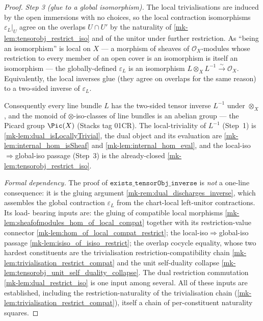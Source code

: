 \begin{proof}
  \emph{Step 3 (glue to a global isomorphism).} The local trivialisations are induced
  by the open immersions with no choices, so the local contraction isomorphisms
  \(\varepsilon_L|_U\) agree on the overlaps \(U \cap U'\) by the naturality of
  \ref{mk-lem:tensorobj_restrict_iso} and of the unitor under further restriction. As
  ``being an isomorphism'' is local on \(X\) --- a morphism of sheaves of
  \(\mathcal{O}_X\)-modules whose restriction to every member of an open cover is an
  isomorphism is itself an isomorphism --- the globally-defined \(\varepsilon_L\) is an
  isomorphism \(L \otimes_X L^{-1} \xrightarrow{\sim} \mathcal{O}_X\). Equivalently, the
  local inverses glue (they agree on overlaps for the same reason) to a two-sided
  inverse of \(\varepsilon_L\).

  Consequently every line bundle \(L\) has the two-sided tensor inverse \(L^{-1}\)
  under \(\otimes_X\), and the monoid of \(\otimes\)-iso-classes of line bundles is
  an abelian group --- the Picard group \(\Pic(X)\) (Stacks tag 01CR). The
  local-triviality of \(L^{-1}\) (Step~1) is \ref{mk-lem:dual_isLocallyTrivial}, the
  dual object and its evaluation are \ref{mk-lem:internal_hom_isSheaf} and
  \ref{mk-lem:internal_hom_eval}, and the local-iso\(\Rightarrow\)global-iso passage
  (Step~3) is the already-closed \ref{mk-lem:tensorobj_restrict_iso}.

  \emph{Formal dependency.} The proof of
  \(\mathtt{exists\_tensorObj\_inverse}\) is \emph{not} a one-line consequence: it is
  the gluing argument \ref{mk-rem:dual_discharges_inverse}, which assembles the global
  contraction \(\varepsilon_L\) from the chart-local left-unitor contractions. Its load-
  bearing inputs are: the gluing of compatible local morphisms
  \ref{mk-lem:sheafofmodules_hom_of_local_compat} together with its restriction-value
  connector \ref{mk-lem:hom_of_local_compat_restrict}; the local-iso\(\Rightarrow\)global-iso
  passage \ref{mk-lem:isiso_of_isiso_restrict}; the overlap cocycle equality, whose two
  hardest constituents are the trivialisation restriction-compatibility chain
  \ref{mk-lem:trivialisation_restrict_compat} and the unit self-duality collapse
  \ref{mk-lem:tensorobj_unit_self_duality_collapse}. The dual restriction commutation
  \ref{mk-lem:dual_restrict_iso} is one input among several. All of these inputs are
  established, including the restriction-naturality of the trivialisation chain
  (\ref{mk-lem:trivialisation_restrict_compat}), itself a chain of per-constituent naturality
  squares.
\end{proof}

